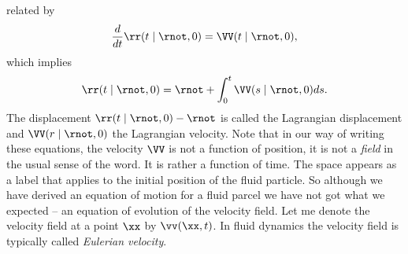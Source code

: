 related by 
\begin{equation}
\frac{d}{dt} \rr(t \mid \rnot,0) = \VV(t\mid\rnot,0) \/,
\end{equation}
which implies
\begin{equation}
\rr(t\mid\rnot,0) = \rnot + \int_0^t\VV(s\mid\rnot,0) ds \/.
\label{A2.1:Ldisplacement}
\end{equation}
The displacement $\rr(t\mid\rnot,0)-\rnot$ is called the Lagrangian
displacement and $\VV(r\mid\rnot,0)$ the Lagrangian velocity. 
Note that in our way of writing these equations, the velocity $\VV$ is not a function of 
position, it is not a \textit{field} in the usual sense of the word. It is rather a function of time. 
The space appears as a label that applies to the initial position of the fluid particle. 
So although we have derived an equation of motion for a fluid parcel
we have not got what we expected -- an equation of evolution of the
velocity field. Let me denote the velocity field at a point $\xx$ by
$\vv(\xx,t)$. In fluid dynamics the velocity field is typically called
\textit{Eulerian velocity}. 

